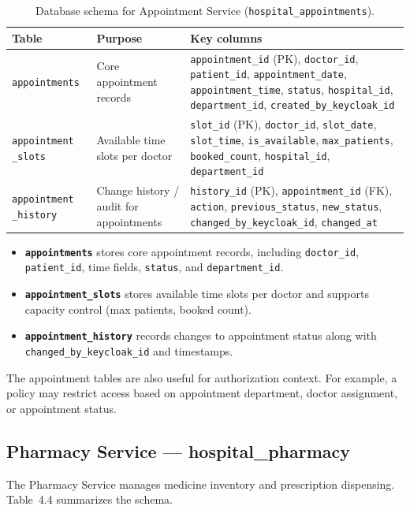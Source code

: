\begin{table}[H]
\centering
\renewcommand{\arraystretch}{1.2}
\begin{tabular}{|p{3.2cm}|p{5.6cm}|p{5.6cm}|}
\hline
\textbf{Table} & \textbf{Purpose} & \textbf{Key columns} \\
\hline
\texttt{appointments} &
Core appointment records &
\texttt{appointment\_id} (PK), \texttt{doctor\_id}, \texttt{patient\_id}, \texttt{appointment\_date}, \texttt{appointment\_time}, \texttt{status}, \texttt{hospital\_id}, \texttt{department\_id}, \texttt{created\_by\_keycloak\_id} \\
\hline
\texttt{appointment \_slots} &
Available time slots per doctor &
\texttt{slot\_id} (PK), \texttt{doctor\_id}, \texttt{slot\_date}, \texttt{slot\_time}, \texttt{is\_available}, \texttt{max\_patients}, \texttt{booked\_count}, \texttt{hospital\_id}, \texttt{department\_id} \\
\hline
\texttt{appointment \_history} &
Change history / audit for appointments &
\texttt{history\_id} (PK), \texttt{appointment\_id} (FK), \texttt{action}, \texttt{previous\_status}, \texttt{new\_status}, \texttt{changed\_by\_keycloak\_id}, \texttt{changed\_at} \\
\hline
\end{tabular}
\caption{Database schema for Appointment Service (\texttt{hospital\_appointments}).}
\label{tab:db-schema-appointment-service2}
\end{table}
\begin{itemize}
  \item \textbf{\texttt{appointments}} stores core appointment records, including \texttt{doctor\_id}, \texttt{patient\_id}, time fields, \texttt{status}, and \texttt{department\_id}.
  \item \textbf{\texttt{appointment\_slots}} stores available time slots per doctor and supports capacity control (max patients, booked count).
  \item \textbf{\texttt{appointment\_history}} records changes to appointment status along with \texttt{changed\_by\_keycloak\_id} and timestamps.
\end{itemize}
The appointment tables are also useful for authorization context. For example, a policy may restrict access based on appointment department, doctor assignment, or appointment status.


\subsection{Pharmacy Service — hospital\_pharmacy}
The Pharmacy Service manages medicine inventory and prescription dispensing. Table~4.4 summarizes the schema.


